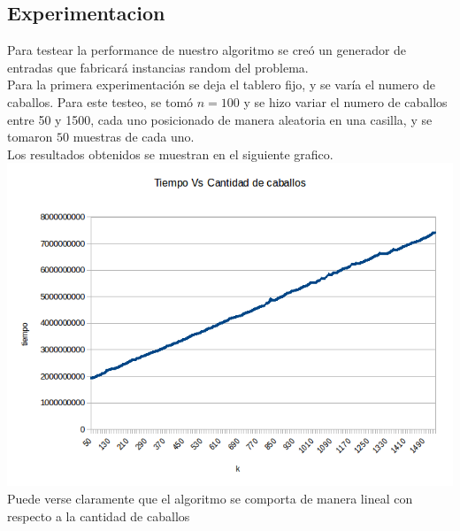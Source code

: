 \subsection{Experimentacion}
Para testear la performance de nuestro algoritmo se cre\'o un generador de entradas que fabricar\'a instancias random del problema.
\\
Para la primera experimentaci\'on se deja el tablero fijo, y se var\'ia el numero de caballos. Para este testeo, se tom\'o $n = 100$ y se hizo variar el numero de caballos entre 50 y 1500, cada uno posicionado de manera aleatoria en una casilla, y se tomaron $50$ muestras de cada uno.
\\
Los resultados obtenidos se muestran en el siguiente grafico.
\\
\includegraphics[scale=0.5]{Ej2/testingk.png}
\\
Puede verse claramente que el algoritmo se comporta de manera lineal con respecto a la cantidad de caballos